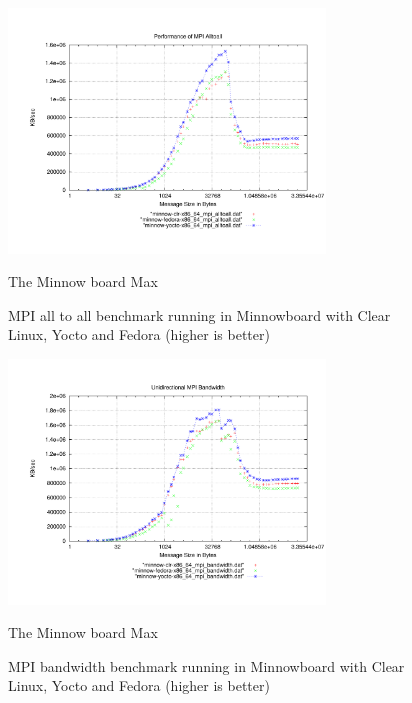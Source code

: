 \begin{figure}[H]
\centering
\includegraphics[width=0.75\textwidth]{images/mpbench_yocto_experiments/mpi_alltoall.pdf}
\caption{The Minnow board Max}
\caption{MPI all to all benchmark running in Minnowboard with Clear Linux, Yocto
and Fedora (higher is better)}
\label{fig:5.8}
\end{figure}


\begin{figure}[H]
\centering
\includegraphics[width=0.75\textwidth]{images/mpbench_yocto_experiments/mpi_bandwidth.pdf}
\caption{The Minnow board Max}
\caption{MPI bandwidth benchmark running in Minnowboard with Clear Linux,
Yocto and Fedora (higher is better)}
\label{fig:5.9}
\end{figure}


